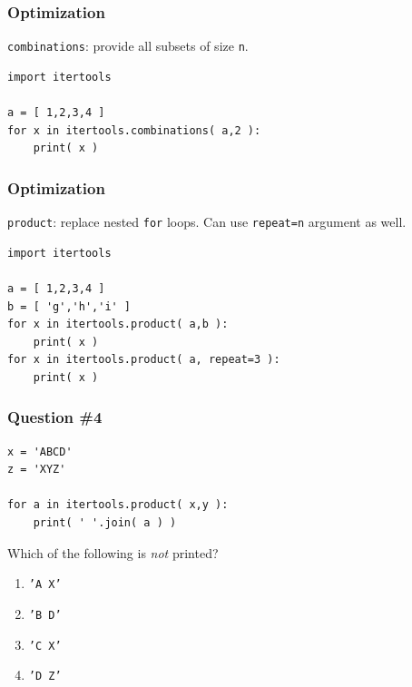 \documentclass[11pt]{beamer}
\begin{document}
\begin{frame}[fragile]
  \frametitle{Optimization}
  \Enlarge

  \begin{enumerate}
  \myitem  \texttt{combinations}:  provide all subsets of size \texttt{n}.
  \end{enumerate}
  \begin{Verbatim}
import itertools

a = [ 1,2,3,4 ]
for x in itertools.combinations( a,2 ):
    print( x )
  \end{Verbatim}
\end{frame}

\begin{frame}[fragile]
  \frametitle{Optimization}
  \Enlarge

  \begin{enumerate}
  \myitem  \texttt{product}:  replace nested \texttt{for} loops.
  \myitem  Can use \texttt{repeat=n} argument as well.
  \end{enumerate}
  \begin{Verbatim}
import itertools

a = [ 1,2,3,4 ]
b = [ 'g','h','i' ]
for x in itertools.product( a,b ):
    print( x )
for x in itertools.product( a, repeat=3 ):
    print( x )
  \end{Verbatim}
\end{frame}

\begin{frame}[fragile]
  \frametitle{Question \#4}

  \begin{Verbatim}
x = 'ABCD'
z = 'XYZ'

for a in itertools.product( x,y ):
    print( ' '.join( a ) )
  \end{Verbatim}

Which of the following is \emph{not} printed?

  \begin{enumerate}[label=\Alph*]
    \item  \texttt{'A X'}
    \item  \texttt{'B D'}
    \item  \texttt{'C X'}
    \item  \texttt{'D Z'}
  \end{enumerate}
\end{frame}
\end{document}
